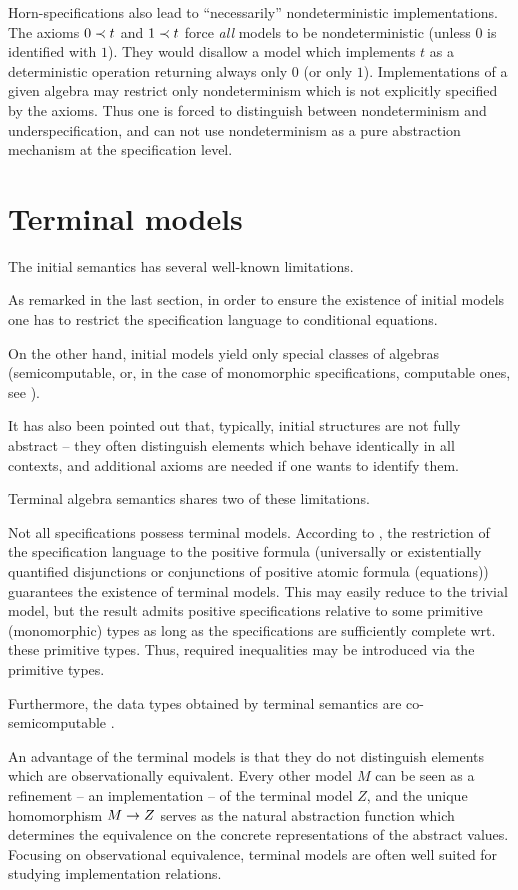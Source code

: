 {Horn-specifications also lead to ``necessarily'' nondeterministic implementations. 
The axioms $0\mathrel{\prec} t$ and 
$1\mathrel{\prec} t$ force {\em all} models to be nondeterministic (unless $0$ is identified with $1$). 
They would disallow a model 
which implements $t$ as a deterministic operation returning always only 
$0$ (or only $1$). Implementations of 
a given algebra may restrict only nondeterminism which is not explicitly specified by the axioms. Thus 
one is forced to distinguish between nondeterminism and underspecification, and can not use 
nondeterminism as a pure abstraction mechanism at the specification level. 

\section{Terminal models}\label{se:terminal}
The initial semantics has several well-known limitations. 
\begin{enum}
\item As remarked in the last section, in order to 
ensure the existence of initial models one has to restrict the specification language to conditional 
equations. 
\item On the other hand, initial models yield only special classes of algebras (semicomputable, or, 
in the case of monomorphic specifications, computable ones, see \cite{c:12, c:14}).  
\item It has also been pointed out 
\cite{c:56, c:19, c:21} that, typically, initial structures are not fully 
abstract -- they often distinguish elements which 
behave identically in all contexts, and additional axioms are needed if one wants to identify them.
\end{enum}
Terminal algebra semantics shares two of these limitations. 
\begin{enum}
\item Not all specifications possess terminal models.  According to 
\cite{c:17}, the restriction of the specification language to the positive 
formula (universally or existentially quantified disjunctions or 
conjunctions of positive atomic formula (equations)) guarantees the 
existence of terminal models.  This may easily reduce to the trivial model, 
but the result admits positive specifications relative to some primitive 
(monomorphic) types as long as the specifications are sufficiently complete 
wrt.  these primitive types.  Thus, required inequalities may be introduced 
via the primitive types.  \item Furthermore, the data types obtained by 
terminal semantics are co-semicomputable \cite{c:12, c:14}.
\end{enum}
An advantage of the terminal models is that they do not distinguish 
elements which are observationally equivalent.  Every other model $M$ can 
be seen as a refinement -- an implementation -- of the terminal model $Z$, 
and the unique homomorphism $M\mathrel{\rightarrow} Z$ serves as the natural abstraction 
function which determines the equivalence on the concrete representations 
of the abstract values.  Focusing on observational equivalence, terminal 
models are often well suited for studying implementation relations.

}
